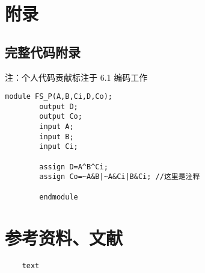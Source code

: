 
\section{附录}

\subsection{完整代码附录}
注：个人代码贡献标注于 6.1 编码工作
  \begin{lstlisting}[style=verilog, title=\texttt{示例}, basicstyle=\zihao{-4}\ttfamily]
		module FS_P(A,B,Ci,D,Co);
		output D;
		output Co;
		input A;
		input B;
		input Ci;
	
		assign D=A^B^Ci;
		assign Co=~A&B|~A&Ci|B&Ci; //这里是注释

		endmodule	
	\end{lstlisting}
\section{参考资料、文献}
\begin{lstlisting}
    text
\end{lstlisting}

